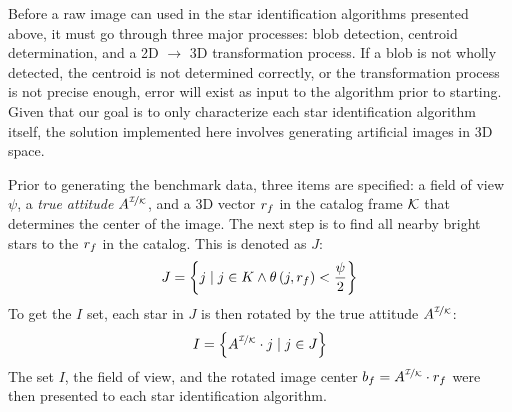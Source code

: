 Before a raw image can used in the star identification algorithms presented above, it must go through three major
processes: blob detection, centroid determination, and a 2D $\rightarrow$ 3D transformation process.
If a blob is not wholly detected, the centroid is not determined correctly, or the transformation process
is not precise enough, error will exist as input to the algorithm prior to starting.
Given that our goal is to only characterize each star identification algorithm itself, the solution implemented here
involves generating artificial images in 3D space.

Prior to generating the benchmark data, three items are specified: a field of view $\psi$, a \textit{true attitude}
$A^{\nicefrac{\mathcal{I}}{\mathcal{K}}}$, and a 3D vector $r_f$ in the catalog frame $\mathcal{K}$ that determines
the center of the image.
The next step is to find all nearby bright stars to the $r_f$ in the catalog.
This is denoted as $J$:
\begin{equation}
    J = \left\{  j \mid j \in K \land \theta\left( j, r_f \right) < \frac{\psi}{2}  \right\}
\end{equation}
To get the $I$ set, each star in $J$ is then rotated by the true attitude $A^{\nicefrac{\mathcal{I}}{\mathcal{K}}}$:
\begin{equation}
    I = \left\{  A^{\nicefrac{\mathcal{I}}{\mathcal{K}}} \cdot j \mid j \in J  \right\}
\end{equation}
The set $I$, the field of view, and the rotated image center $b_f = A^{\nicefrac{\mathcal{I}}{\mathcal{K}}} \cdot r_f$
were then presented to each star identification algorithm.

